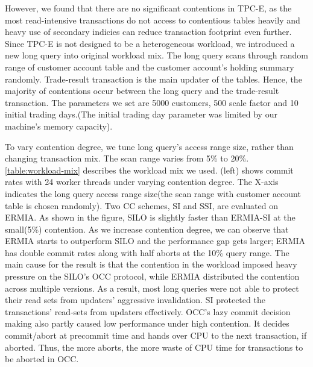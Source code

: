 However, we found that there are no significant contentions in TPC-E, as the most read-intensive transactions do not access to contentious tables heavily and heavy use of secondary indicies can reduce transaction footprint even further. Since TPC-E is not designed to be a heterogeneous workload, we introduced a new long query into original workload mix. The long query scans through random range of customer account table and the customer account's holding summary randomly. Trade-result transaction is the main updater of the tables. Hence, the majority of contentions occur between the long query and the trade-result transaction. 
The parameters we set are 5000 customers, 500 scale factor and 10 initial trading days.(The initial trading day parameter was limited by our machine's memory capacity). %


To vary contention degree, we tune long query's access range size, rather than changing transaction mix. The scan range varies from 5\% to 20\%. \ref{table:workload-mix} describes the workload mix we used. %
(left) shows commit rates with 24 worker threads under varying contention degree. The X-axis indicates the long query access range size(the scan range with customer account table is chosen randomly). Two CC schemes, SI and SSI, are evaluated on ERMIA. As shown in the figure, SILO is slightly faster than ERMIA-SI at the small(5\%) contention. As we increase contention degree, we can observe that ERMIA starts to outperform SILO and the performance gap gets larger; ERMIA has double commit rates along with half aborts at the 10\% query range. %
The main cause for the result is that the contention in the workload imposed heavy pressure on the SILO's OCC protocol, while ERMIA distributed the contention across multiple versions. As a result, most long queries were not able to protect their read sets from updaters' aggressive invalidation. SI protected the transactions' read-sets from updaters effectively. OCC's lazy commit decision making also partly caused low performance under high contention. It decides commit/abort at precommit time and hands over CPU to the next transaction, if aborted. Thus, the more aborts, the more waste of CPU time for transactions to be aborted in OCC.

